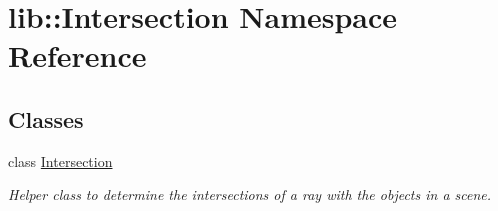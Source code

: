 \hypertarget{namespacelib_1_1Intersection}{\section{lib\-:\-:\-Intersection \-Namespace \-Reference}
\label{namespacelib_1_1Intersection}
}
\subsection*{\-Classes}
\begin{DoxyCompactItemize}
\item 
class \hyperlink{classlib_1_1Intersection_1_1Intersection}{\-Intersection}
\begin{DoxyCompactList}\small\item\em \-Helper class to determine the intersections of a ray with the objects in a scene. \end{DoxyCompactList}\end{DoxyCompactItemize}

